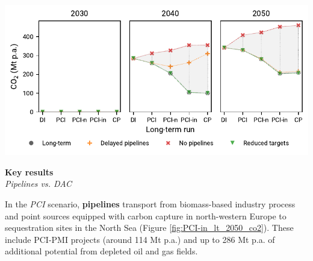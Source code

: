 \documentclass[a0,portrait]{a0poster}
\begin{document}
\begin{multicols}{3}
\noindent
\begin{center}
  \includegraphics[width=\linewidth]{delta_balances_DAC.pdf}
  \label{fig:dac_balance}
\end{center}
\vspace{2em}

\columnbreak

\noindent \textcolor{red100}{\huge \textbf{Key results}}
\\
\textit{Pipelines vs. DAC}

\noindent In the \textit{PCI} scenario, \textbf{ pipelines} transport  from biomass-based industry process and point sources equipped with carbon capture in north-western Europe to sequestration sites in the North Sea (Figure \ref{fig:PCI-in_lt_2050_co2}). These include PCI-PMI projects (around 114 Mt p.a.) and up to 286 Mt p.a. of additional potential from depleted oil and gas fields.


\end{multicols}
\end{document}
